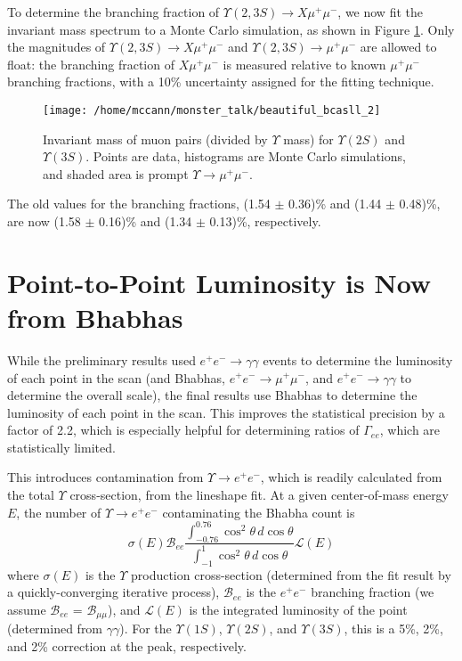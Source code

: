 \documentclass[12pt]{article}
\begin{document}
To determine the branching fraction of $\Upsilon(2,3S) \to X
\mu^+\mu^-$, we now fit the invariant mass spectrum to a Monte Carlo
simulation, as shown in Figure \ref{beaut}.  Only the magnitudes of
$\Upsilon(2,3S) \to X \mu^+\mu^-$ and $\Upsilon(2,3S) \to \mu^+\mu^-$
are allowed to float: the branching fraction of $X \mu^+\mu^-$ is
measured relative to known $\mu^+\mu^-$ branching fractions, with a
10\% uncertainty assigned for the fitting technique.

\begin{figure}
\texttt{[image: /home/mccann/monster\_talk/beautiful\_bcasll\_2]}
\caption{\label{beaut} Invariant mass of muon pairs (divided by $\Upsilon$ mass) for $\Upsilon(2S)$ and $\Upsilon(3S)$.  Points are data, histograms are Monte Carlo simulations, and shaded area is prompt $\Upsilon \to \mu^+\mu^-$.}
\end{figure}

The old values for the branching fractions, (1.54 $\pm$ 0.36)\% and
(1.44 $\pm$ 0.48)\%, are now (1.58 $\pm$ 0.16)\% and (1.34 $\pm$
0.13)\%, respectively.

\section{Point-to-Point Luminosity is Now from Bhabhas}

While the preliminary results used $e^+e^- \to \gamma\gamma$ events to
determine the luminosity of each point in the scan (and Bhabhas,
$e^+e^- \to \mu^+\mu^-$, and $e^+e^- \to \gamma\gamma$ to determine
the overall scale), the final results use Bhabhas to determine the
luminosity of each point in the scan.  This improves the statistical
precision by a factor of 2.2, which is especially helpful for
determining ratios of $\Gamma_{ee}$, which are statistically limited.

This introduces contamination from $\Upsilon \to e^+e^-$, which is
readily calculated from the total $\Upsilon$ cross-section, from the
lineshape fit.  At a given center-of-mass energy $E$, the number of
$\Upsilon \to e^+e^-$ contaminating the Bhabha count is
\begin{equation}
\sigma(E) {\mathcal B}_{ee} \frac{\int_{-0.76}^{0.76} \cos^2\theta \,
  d\cos\theta}{\int_{-1}^{1} \cos^2\theta \, d\cos\theta} {\mathcal L}(E)
\end{equation}
where $\sigma(E)$ is the $\Upsilon$ production cross-section
(determined from the fit result by a quickly-converging iterative
process), ${\mathcal B}_{ee}$ is the $e^+e^-$ branching fraction (we
assume ${\mathcal B}_{ee}$ = ${\mathcal B}_{\mu\mu}$), and ${\mathcal
  L}(E)$ is the integrated luminosity of the point (determined from
$\gamma\gamma$).  For the $\Upsilon(1S)$, $\Upsilon(2S)$, and
$\Upsilon(3S)$, this is a 5\%, 2\%, and 2\% correction at the peak,
respectively.
\end{document}
